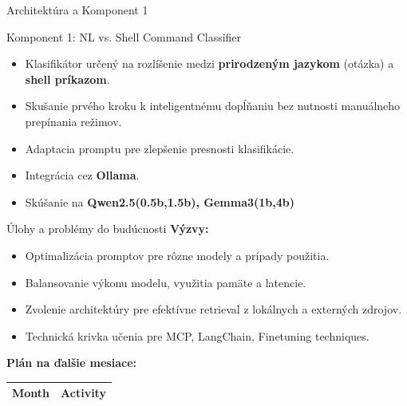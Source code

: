 \documentclass[10pt]{beamer}
\begin{document}
\begin{frame}{Architektúra a Komponent 1}
    \vspace{0.3cm}
    \begin{block}{Komponent 1: NL vs. Shell Command Classifier}
        \begin{itemize}
            \item Klasifikátor určený na rozlíšenie medzi \textbf{prirodzeným jazykom} (otázka) a \textbf{shell príkazom}.
            \item Skušanie prvého kroku k inteligentnému dopĺňaniu bez nutnosti manuálneho prepínania režimov.
            \item Adaptacia promptu pre zlepšenie presnosti klasifikácie.
        \end{itemize}
    \end{block}
    \begin{itemize}
        \item Integrácia cez \textbf{Ollama}.
        \item Skúšanie na \textbf{Qwen2.5(0.5b,1.5b), Gemma3(1b,4b)}
    \end{itemize}
\end{frame}


\begin{frame}{Úlohy a problémy do budúcnosti}
    \textbf{Výzvy:}
    \begin{itemize}
        \item Optimalizácia promptov pre rôzne modely a prípady použitia.
        \item Balansovanie výkonu modelu, využitia pamäte a latencie.
        \item Zvolenie architektúry pre efektívne retrieval z lokálnych a externých zdrojov.
        \item Technická krivka učenia pre MCP, LangChain, Finetuning techniques.
    \end{itemize}

    \vspace{0.3cm}
    \textbf{Plán na ďalšie mesiace:}
    \begin{table}
        \begin{tabular}{ll}
            \toprule
            \textbf{Month} & \textbf{Activity} \\
            \midrule
%
        \end{tabular}
    \end{table}
\end{frame}
\end{document}
